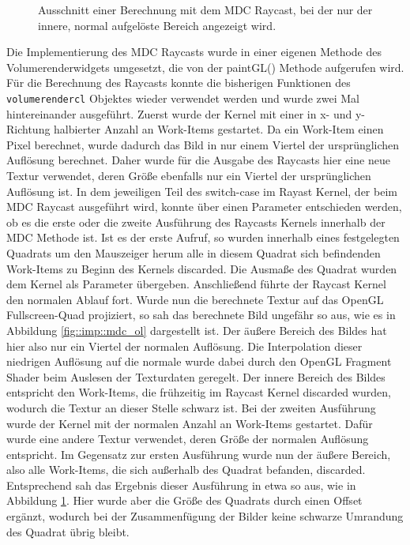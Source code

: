 \begin{figure}[]
\begin{minipage}[t]{0.49\textwidth}
		\caption{Ausschnitt einer Berechnung mit dem MDC Raycast, bei der nur der innere, normal aufgelöste Bereich angezeigt wird.}
		\label{fig::imp::mdc_il}
	\end{minipage}
\end{figure}

Die Implementierung des MDC Raycasts wurde in einer eigenen Methode des Volumerenderwidgets umgesetzt, die von der paintGL() Methode aufgerufen wird.
Für die Berechnung des Raycasts konnte die bisherigen Funktionen des \texttt{volumerendercl} Objektes wieder verwendet werden und wurde zwei Mal hintereinander ausgeführt.
Zuerst wurde der Kernel mit einer in x- und y-Richtung halbierter Anzahl an Work-Items gestartet.
Da ein Work-Item einen Pixel berechnet, wurde dadurch das Bild in nur einem Viertel der ursprünglichen Auflösung berechnet.
Daher wurde für die Ausgabe des Raycasts hier eine neue Textur verwendet, deren Größe ebenfalls nur ein Viertel der ursprünglichen Auflösung ist.
In dem jeweiligen Teil des switch-case im Rayast Kernel, der beim MDC Raycast ausgeführt wird, konnte über einen Parameter entschieden werden, ob es die erste oder die zweite Ausführung des Raycasts Kernels innerhalb der MDC Methode ist.
Ist es der erste Aufruf, so wurden innerhalb eines festgelegten Quadrats um den Mauszeiger herum alle in diesem Quadrat sich befindenden Work-Items zu Beginn des Kernels discarded.
Die Ausmaße des Quadrat wurden dem Kernel als Parameter übergeben.
Anschließend führte der Raycast Kernel den normalen Ablauf fort.
Wurde nun die berechnete Textur auf das OpenGL Fullscreen-Quad projiziert, so sah das berechnete Bild ungefähr so aus, wie es in Abbildung \ref{fig::imp::mdc_ol} dargestellt ist.
Der äußere Bereich des Bildes hat hier also nur ein Viertel der normalen Auflösung.
Die Interpolation dieser niedrigen Auflösung auf die normale wurde dabei durch den OpenGL Fragment Shader beim Auslesen der Texturdaten geregelt.
Der innere Bereich des Bildes entspricht den Work-Items, die frühzeitig im Raycast Kernel discarded wurden, wodurch die Textur an dieser Stelle schwarz ist.
Bei der zweiten Ausführung wurde der Kernel mit der normalen Anzahl an Work-Items gestartet.
Dafür wurde eine andere Textur verwendet, deren Größe der normalen Auflösung entspricht.
Im Gegensatz zur ersten Ausführung wurde nun der äußere Bereich, also alle Work-Items, die sich außerhalb des Quadrat befanden, discarded.
Entsprechend sah das Ergebnis dieser Ausführung in etwa so aus, wie in Abbildung \ref{fig::imp::mdc_il}.
Hier wurde aber die Größe des Quadrats durch einen Offset ergänzt, wodurch bei der Zusammenfügung der Bilder keine schwarze Umrandung des Quadrat übrig bleibt.

